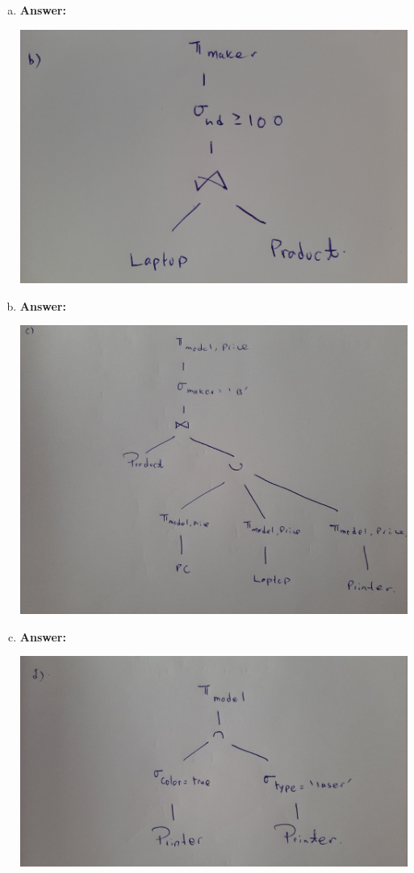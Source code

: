 \documentclass[12pt]{article}
\begin{document}
\begin{enumerate}
\begin{enumerate}[a)]
        \item

        \textbf{Answer:}

        \bigskip

        \begin{center}
        \includegraphics[width=0.7\linewidth]{images/worksheet_2_solution_12.jpg}
        \end{center}

        \item

        \textbf{Answer:}

        \bigskip

        \begin{center}
        \includegraphics[width=0.7\linewidth]{images/worksheet_2_solution_13.jpg}
        \end{center}

        \item

        \textbf{Answer:}

        \bigskip

        \begin{center}
        \includegraphics[width=0.7\linewidth]{images/worksheet_2_solution_14.jpg}
        \end{center}


\end{enumerate}
\end{enumerate}
\end{document}
